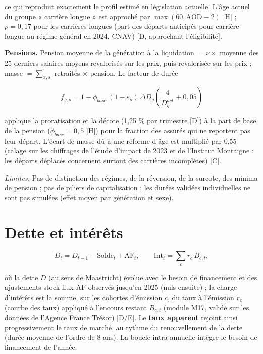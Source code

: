 \documentclass[
  11pt,
  11pt,
  a4paper,
  openany]{book}
\begin{document}
ce qui reproduit exactement le profil estimé en législation actuelle.
L'âge actuel du groupe « carrière longue » est approché par
\(\max(60, \text{AOD} - 2)\) {[}H{]} ; \(p = 0{,}17\) pour les carrières
longues (part des départs anticipés pour carrière longue au régime
général en 2024, CNAV) {[}D, approchant l'éligibilité{]}.

\textbf{Pensions.} Pension moyenne de la génération à la liquidation
\(= \nu \times\) moyenne des 25 derniers salaires moyens revalorisés sur
les prix, puis revalorisée sur les prix ; masse \(= \sum_{x,s}\)
retraités \(\times\) pension. Le facteur de durée

\[f_{g,s} = 1 - \phi_{base}\,(1 - \varepsilon_s)\,\Delta D_g \left(\frac{4}{D^{act}_g} + 0{,}05\right)\]

applique la proratisation et la décote (1,25 \% par trimestre {[}D{]}) à
la part de base de la pension (\(\phi_{base} = 0{,}5\) {[}H{]}) pour la
fraction des assurés qui ne reportent pas leur départ. L'écart de masse
dû à une réforme d'âge est multiplié par 0,55 (calage sur les chiffrages
de l'étude d'impact de 2023 et de l'Institut Montaigne : les départs
déplacés concernent surtout des carrières incomplètes) {[}C{]}.

\emph{Limites.} Pas de distinction des régimes, de la réversion, de la
surcote, des minima de pension ; pas de piliers de capitalisation ; les
durées validées individuelles ne sont pas simulées (effet moyen par
génération et sexe).

\hypertarget{sec:eq-dette}{%
\section{Dette et intérêts}\label{sec:eq-dette}}

\[D_t = D_{t-1} - \text{Solde}_t + \text{AF}_t, \qquad \text{Int}_t = \sum_{c} r_c\,B_{c,t}, \]

où la dette \(D\) (au sens de Maastricht) évolue avec le besoin de
financement et des ajustements stock-flux \(\text{AF}\) observés
jusqu'en 2025 (nuls ensuite) ; la charge d'intérêts est la somme, sur
les cohortes d'émission \(c\), du taux à l'émission \(r_c\) (courbe des
taux) appliqué à l'encours restant \(B_{c,t}\) (module M17, validé sur
les données de l'Agence France Trésor) {[}D/E{]}. Le \textbf{taux
apparent} rejoint ainsi progressivement le taux de marché, au rythme du
renouvellement de la dette (durée moyenne de l'ordre de 8 ans). La
boucle intra-annuelle intègre le besoin de financement de l'année.
\end{document}
